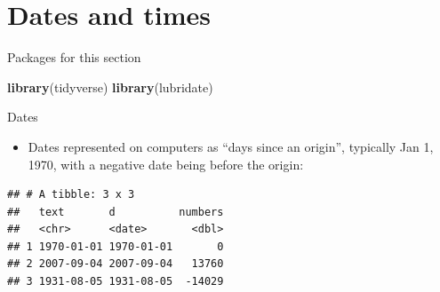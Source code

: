 \documentclass[
  ignorenonframetext,
]{beamer}
\newenvironment{Shaded}{\begin{snugshade}}{\end{snugshade}}
\newcommand{\DataTypeTok}[1]{\textcolor[rgb]{0.13,0.29,0.53}{#1}}
\newcommand{\KeywordTok}[1]{\textcolor[rgb]{0.13,0.29,0.53}{\textbf{#1}}}
\newcommand{\NormalTok}[1]{#1}
\newcommand{\OperatorTok}[1]{\textcolor[rgb]{0.81,0.36,0.00}{\textbf{#1}}}
\newcommand{\StringTok}[1]{\textcolor[rgb]{0.31,0.60,0.02}{#1}}
\providecommand{\tightlist}{%
  \setlength{\itemsep}{0pt}\setlength{\parskip}{0pt}}
\begin{document}
\hypertarget{dates-and-times}{%
\section{Dates and times}\label{dates-and-times}}

\begin{frame}[fragile]{Packages for this section}
\protect\hypertarget{packages-for-this-section-9}{}

\begin{Shaded}
\begin{Highlighting}[]
\KeywordTok{library}\NormalTok{(tidyverse)}
\KeywordTok{library}\NormalTok{(lubridate)}
\end{Highlighting}
\end{Shaded}

\end{frame}

\begin{frame}[fragile]{Dates}
\protect\hypertarget{dates}{}

\begin{itemize}
\tightlist
\item
  Dates represented on computers as ``days since an origin'', typically
  Jan 1, 1970, with a negative date being before the origin:
\end{itemize}

\begin{Shaded}
\end{Shaded}

\begin{verbatim}
## # A tibble: 3 x 3
##   text       d          numbers
##   <chr>      <date>       <dbl>
## 1 1970-01-01 1970-01-01       0
## 2 2007-09-04 2007-09-04   13760
## 3 1931-08-05 1931-08-05  -14029
\end{verbatim}

\end{frame}
\end{document}
